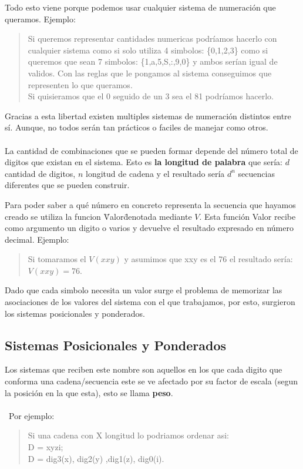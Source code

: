 \documentclass{article}
\begin{document}
Todo esto viene porque podemos usar cualquier sistema de numeración que queramos.
Ejemplo:
\begin{quote}
    Si queremos representar cantidades numericas podríamos hacerlo con cualquier
    sistema como si solo utiliza 4 simbolos: \{0,1,2,3\} como si queremos que sean
    7 simbolos: \{1,a,5,S,:,9,0\} y ambos serían igual de validos. Con las reglas
    que le pongamos al sistema conseguimos que representen lo que queramos.\\
    Si quisieramos que el 0 seguido de un 3 sea el 81 podríamos hacerlo.
\end{quote}

Gracias a esta libertad existen multiples sistemas de numeración distintos entre
sí. Aunque, no todos serán tan prácticos o faciles de manejar como otros.\\\\

La cantidad de  combinaciones que se pueden formar depende del número total
de digitos que existan en el sistema. Esto es \textbf{la longitud de palabra}
que sería: 
$d$ cantidad de digitos, $n$ longitud de cadena y el resultado sería $d^n$ 
secuencias diferentes que se pueden construir.

Para poder saber a qué número en concreto representa la secuencia que hayamos
creado se utiliza la funcion \"Valor\" denotada mediante $V$. Esta función Valor
recibe como argumento un digito o varios y devuelve el resultado expresado en
número decimal.
Ejemplo:
\begin{quote}
    Si tomaramos el $V(xxy)$ y asumimos que xxy es el 76 el resultado sería:
    $V(xxy)=76$.
\end{quote}

Dado que cada simbolo necesita un valor surge el problema de memorizar
las asociaciones de los valores del sistema con el que trabajamos, por esto,
surgieron los sistemas posicionales y ponderados.

\subsection{Sistemas Posicionales y Ponderados}

Los sistemas que reciben este nombre son aquellos en los que cada digito
que conforma una cadena/secuencia este se ve afectado por su factor de escala
(segun la posición en la que esta), esto se llama \textbf{peso}.\\\\\
Por ejemplo:
\begin{quote}
    Si una cadena con X longitud lo podriamos ordenar asi:\\
    D = xyzi;\\
    D = dig3(x), dig2(y) ,dig1(z), dig0(i).
\end{quote}
\end{document}
